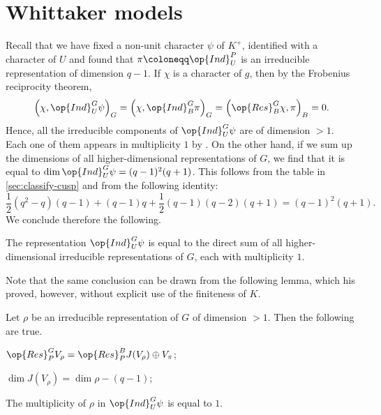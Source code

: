 \documentclass[../main.tex]{subfiles}
\begin{document}
\section{Whittaker models}
Recall that we have fixed a non-unit character $\psi$ of $K^+$, identified with a character of $U$ and found that $\pi\coloneqq\op{Ind}^P_U$ is an irreducible representation of dimension $q-1$. If $\chi$ is a character of $g$, then by the Frobenius reciprocity theorem,
\[\left(\chi,\op{Ind}^G_U\psi\right)_G=\left(\chi,\op{Ind}^G_B\pi\right)_G=\left(\op{Res}^G_B\chi,\pi\right)_B=0.\]
Hence, all the irreducible components of $\op{Ind}^G_U\psi$ are of dimension $>1$. Each one of them appears in multiplicity $1$ by . On the other hand, if we sum up the dimensions of all higher-dimensional representations of $G$, we find that it is equal to $\dim\op{Ind}^G_U\psi=(q-1)^2(q+1)$. This follows from the table in \cref{sec:classify-cusp} and from the following identity:
\[\frac12\left(q^2-q\right)(q-1)+(q-1)q+\frac12(q-1)(q-2)(q+1)=(q-1)^2(q+1).\]
We conclude therefore the following.
\begin{theorem} \label{thm:ind-psi-has-reps}
	The representation $\op{Ind}^G_U\psi$ is equal to the direct sum of all higher-dimensional irreducible representations of $G$, each with multiplicity $1$.
\end{theorem}
Note that the same conclusion can be drawn from the following lemma, which his proved, however, without explicit use of the finiteness of $K$.
\begin{lemma} \label{lem:ind-psi-has-reps}
	Let $\rho$ be an irreducible representation of $G$ of dimension $>1$. Then the following are true.
	\begin{listalph}
		\item $\op{Res}^G_PV_\rho=\op{Res}^B_PJ(V_\rho)\oplus V_\pi$;
		\item $\dim J(V_\rho)=\dim\rho-(q-1)$;
		\item The multiplicity of $\rho$ in $\op{Ind}^G_U\psi$ is equal to $1$.
	\end{listalph}
\end{lemma}
\end{document}
